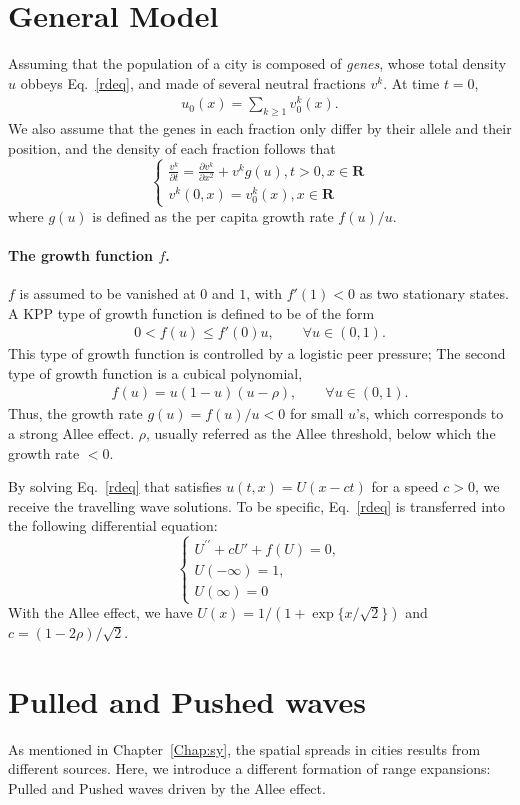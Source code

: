 \section{General Model}

Assuming that the population of a city is composed of \textit{genes}, whose total density $u$ obbeys Eq.~\ref{rdeq}, and made of several neutral fractions $v^k$. At time $t=0$, \begin{align}
    u_0(x) = \sum_{k\geq 1} v_0^k(x).
\end{align}
We also assume that the genes in each fraction only differ by their allele and their position, and the density of each fraction follows that\begin{equation}
    \left\{\begin{array}{l}
    \frac{v^{k}}{\partial{t}}=\frac{\partial v^{k}}{\partial x^2}+v^{k} g(u), t>0, x \in \mathbf{R} \\
    v^{k}(0, x)=v_{0}^{k}(x), x \in \mathbf{R}
    \end{array}\right.
\end{equation} where $g(u)$ is defined as the per capita growth rate $f(u)/u$. 

\paragraph{The growth function $f$.} 
$f$ is assumed to be vanished at $0$ and $1$, with $f'(1)<0$ as two stationary states. A KPP type of growth function is defined to be of the form~\begin{align}
    0<f(u)\le f'(0) u, \qquad \forall u \in (0,1).
\end{align} This type of growth function is controlled by a logistic peer pressure; The second type of growth function is a cubical polynomial,\begin{align}
    f(u) = u(1-u)(u-\rho), \qquad \forall u \in (0,1).
\end{align} Thus, the growth rate $g(u) = f(u)/u < 0$ for small $u$'s, which corresponds to a strong Allee effect. $\rho$, usually referred as the Allee threshold, below which the growth rate $<0$.

By solving Eq.~\ref{rdeq} that satisfies $u(t,x) = U(x-ct)$ for a speed $c>0$, we receive the travelling wave solutions. To be specific, Eq.~\ref{rdeq} is transferred into the following differential equation:\begin{equation}
    \left\{ \begin{array}{l} U^{\prime\prime} + cU' + f(U) = 0,\\
        U(-\infty) = 1,\\
        U(\infty) = 0
    \end{array} \right.
\end{equation}
With the Allee effect, we have $U(x) = 1/(1+\exp\{x/\sqrt{2}\})$ and $c = (1-2\rho)/\sqrt{2}$.

\section{Pulled and Pushed waves}

As mentioned in Chapter~\ref{Chap:sy}, the spatial spreads in cities results from different sources. Here, we introduce a different formation of range expansions: Pulled and Pushed waves driven by the Allee effect.